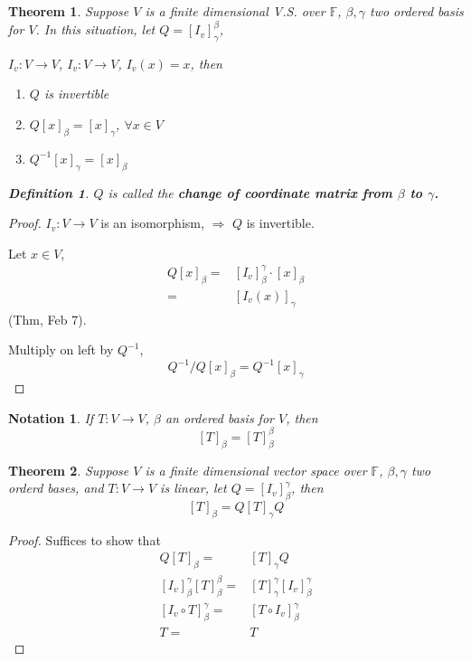 \documentclass[12pt]{article}
\newtheorem{theorem}{Theorem}[subsection]
\newtheorem{definition}{Definition}[subsection]
\newtheorem{notation}{Notation}[subsection]
\newcommand{\mF}{{\mathbb{F}}}
\begin{document}
	\begin{theorem}
		Suppose $V$ is a finite dimensional V.S. over $\mF$, $\beta, \gamma$
		two ordered basis for $V$. In this situation, 
		let $Q = [I_v]^{\beta}_{\gamma}$, 

		$I_v : V \to V$, $I_v: V\to V$, $I_v(x) = x$, then 
		\begin{enumerate}
		\item $Q$ is invertible
		\item $Q[x]_{\beta} = [x]_{\gamma}$, $\forall x \in V$
		\item $Q^{-1}[x]_{\gamma} = [x]_{\beta}$
		\end{enumerate}			
		\begin{definition}
			$Q$ is called the \textbf{change of coordinate matrix from $\beta$
			to $\gamma$.}
		\end{definition}
	\end{theorem}
	\begin{proof}
		$I_v: V \to V$ is an isomorphism, $\Rightarrow$ $Q$ is invertible. 

		Let $x \in V$, 
		\begin{align*}
			Q[x]_{\beta} 
			=& [I_v]_{\beta}^{\gamma} \cdot [x]_{\beta} \\
			=& [I_v(x)]_{\gamma}
		\end{align*}
	 (Thm, Feb 7). 

		Multiply on left by $Q^{-1}$, 
		\[
			Q^{-1}/Q[x]_{\beta} = Q^{-1} [x]_{\gamma}
		\]
	\end{proof}
	
	\begin{notation}
		If $T: V\to V$, $\beta$ an ordered basis for $V$, then 
		\[
			[T]_{\beta} = [T]_{\beta}^{\beta}
		\]
	\end{notation}

	\begin{theorem}
		Suppose $V$ is a finite dimensional vector space over $\mF$, 
		$\beta, \gamma$ two orderd bases, and $T: V\to V$ is linear, 
		let $Q = [I_v]_{\beta}^{\gamma}$, then  
		\[
			[T]_{\beta} = Q[T]_{\gamma} Q
		\]
	\end{theorem}
	\begin{proof}
		Suffices to show that 
		\begin{align*}
			Q[T]_{\beta} =& [T]_{\gamma}Q \\
			[I_v]_{\beta}^{\gamma} [T]_{\beta}^{\beta} = &
			[T]_{\gamma}^{\gamma} [I_v]_{\beta}^{\gamma} \\
			[I_v\circ T] _{\beta}^{\gamma} =& [T\circ I_v]_{\beta}^{\gamma}\\
			T =& T
		\end{align*}
	\end{proof}
\end{document}

